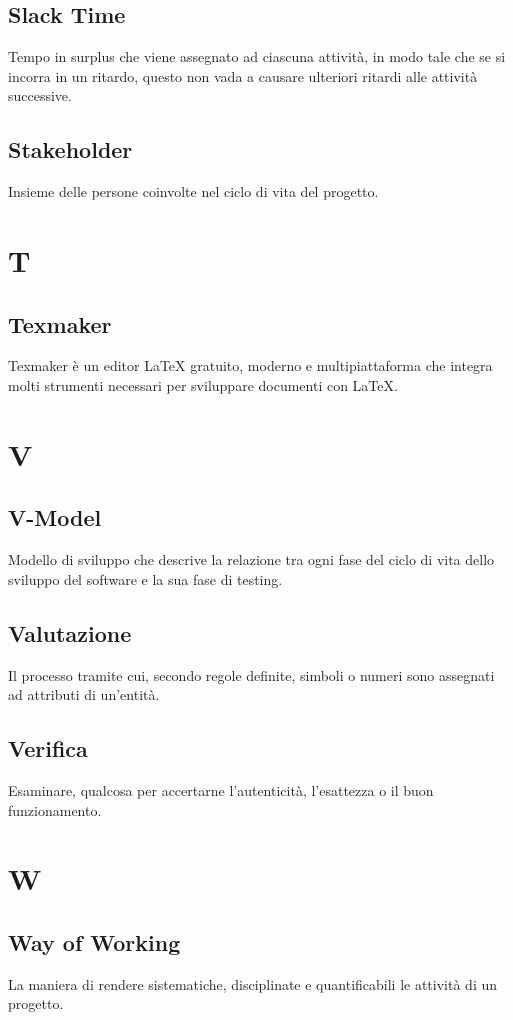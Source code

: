 	\subsection{Slack Time}
	Tempo in surplus che viene assegnato ad ciascuna attività, in modo tale che se si incorra in un ritardo, questo non vada a causare ulteriori ritardi alle attività successive.
	
	\subsection{Stakeholder}
	Insieme delle persone coinvolte nel ciclo di vita del progetto.
	
	\section{T}
	\subsection{Texmaker} 
	Texmaker è un editor LaTeX gratuito, moderno e multipiattaforma che integra molti strumenti necessari per sviluppare documenti con LaTeX. 
	
	\section{V}
	\subsection{V-Model} 
	Modello di sviluppo che descrive la relazione tra ogni fase del ciclo di vita dello sviluppo del software e la sua fase di testing.
	
	\subsection{Valutazione} 
	Il processo tramite cui, secondo regole definite, simboli o numeri sono assegnati ad attributi di un'entità.
	
	\subsection{Verifica}
	Esaminare, qualcosa per accertarne l'autenticità, l'esattezza o il buon funzionamento.
	
	\section{W}
	\subsection{Way of Working} 
	La maniera di rendere sistematiche, disciplinate e quantificabili le attività di un progetto.
	

